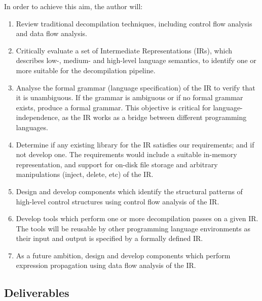 \documentclass[12pt, a4paper]{article}
\begin{document}
In order to achieve this aim, the author will:
\begin{enumerate}
	\item Review traditional decompilation techniques, including control flow analysis and data flow analysis. \label{obj_review_decomp}
	\item Critically evaluate a set of Intermediate Representations (IRs), which describes low-, medium- and high-level language semantics, to identify one or more suitable for the decompilation pipeline. \label{obj_review_suitable_ir}
	\item Analyse the formal grammar (language specification) of the IR to verify that it is unambiguous. If the grammar is ambiguous or if no formal grammar exists, produce a formal grammar. This objective is critical for language-independence, as the IR works as a bridge between different programming languages. \label{obj_formal_ir}
	\item Determine if any existing library for the IR satisfies our requirements; and if not develop one. The requirements would include a suitable in-memory representation, and support for on-disk file storage and arbitrary manipulations (inject, delete, etc) of the IR. \label{obj_ir_library}
	\item Design and develop components which identify the structural patterns of high-level control structures using control flow analysis of the IR. \label{obj_structural_analysis_library}
	\item Develop tools which perform one or more decompilation passes on a given IR. The tools will be reusable by other programming language environments as their input and output is specified by a formally defined IR. \label{obj_structural_analysis_tool}
	\item As a future ambition, design and develop components which perform expression propagation using data flow analysis of the IR. \label{obj_data_analysis_library}
\end{enumerate}


\subsection{Deliverables}
\end{document}
